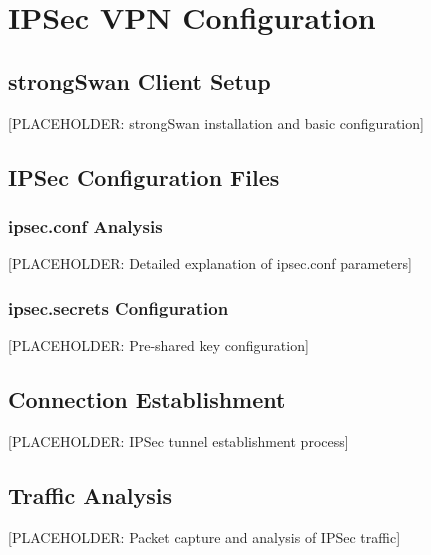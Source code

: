 \newpage

\section{IPSec VPN Configuration}


\subsection{strongSwan Client Setup}
[PLACEHOLDER: strongSwan installation and basic configuration]

\subsection{IPSec Configuration Files}

\subsubsection{ipsec.conf Analysis}
[PLACEHOLDER: Detailed explanation of ipsec.conf parameters]

\subsubsection{ipsec.secrets Configuration}
[PLACEHOLDER: Pre-shared key configuration]

\subsection{Connection Establishment}
[PLACEHOLDER: IPSec tunnel establishment process]

\subsection{Traffic Analysis}
[PLACEHOLDER: Packet capture and analysis of IPSec traffic]
